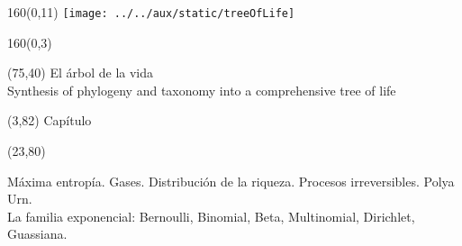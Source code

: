 \documentclass[shownotes,aspectratio=169]{beamer}
\newcounter{capitulo}
\newcommand{\unidad}{\thecapitulo \stepcounter{capitulo}}
\begin{document}
\begin{frame}

\begin{textblock}{160}(0,11)  \centering
\texttt{[image: ../../aux/static/treeOfLife]}
\end{textblock}

\begin{textblock}{160}(0,3) \centering
\LARGE \textcolor{black!85}{}
\end{textblock}



\begin{textblock}{55}(75,40)
\textcolor{black!85}{\small El árbol de la vida \\
\fontsize{2}{0}\selectfont Synthesis of phylogeny and taxonomy into a comprehensive tree of life \\}
\end{textblock}


\begin{textblock}{55}(3,82)
\textcolor{black!85}{Capítulo \unidad}
\end{textblock}

\begin{textblock}{55}(23,80)
\begin{turn}{0}
\parbox{15cm}{\small \textcolor{black!85}{Máxima entropía. Gases. Distribución de la riqueza. Procesos irreversibles. Polya Urn.   \\
La familia exponencial: Bernoulli, Binomial, Beta, Multinomial, Dirichlet, Guassiana.} \\
}
\end{turn}
\end{textblock}

\end{frame}
\end{document}
